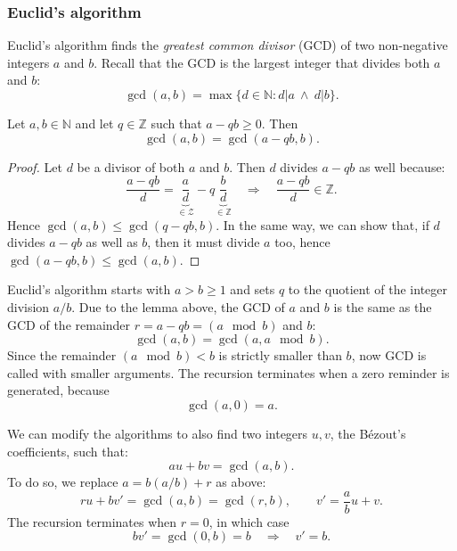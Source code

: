 \subsubsection{Euclid's algorithm}\label{s:impl-euclid}

Euclid's algorithm finds the \emph{greatest common divisor} (GCD) of two non-negative integers $a$ and $b$. Recall that the GCD is the largest integer that divides both $a$ and $b$:
\[
\gcd(a,b) = \max\{ d \in \mathbb{N} : d|a \ \wedge\ d|b \}.
\]

\begin{lemma}
	Let $a,b\in\mathbb{N}$ and let $q\in\mathbb{Z}$ such that $a - qb \geq 0$. Then
	$$
	\gcd(a,b) = \gcd(a-qb,b).
	$$
\end{lemma}
\begin{proof}
	Let $d$ be a divisor of both $a$ and $b$. Then $d$ divides $a - qb$ as well because:
	$$
	\frac{a - qb}{d} = 
	\underbrace{\frac{a}{d}}_{\in\mathcal{Z}} - q 
	\underbrace{\frac{b}{d}}_{\in\mathbb{Z}}
	\quad\Rightarrow\quad
	\frac{a - qb}{d} \in \mathbb{Z}.
	$$
	Hence  $\gcd(a,b) \leq \gcd(q-qb,b)$. In the same way, we can show that, if $d$ divides $a - qb$ as well as $b$, then it must divide $a$ too, hence $\gcd(a-qb, b) \leq\gcd(a,b)$.
\end{proof}

Euclid's algorithm starts with $a > b \geq 1$ and sets $q$ to the quotient of the integer division $a/b$. Due to the lemma above, the GCD of $a$ and $b$ is the same as the GCD of the remainder $r = a - qb = (a \mod b)$ and $b$:
\[
\gcd(a,b) = \gcd(a, a\mod b).
\]
Since the remainder $(a\mod b) < b$ is strictly smaller than $b$, now GCD is called with smaller arguments. The recursion terminates when a zero reminder is generated, because
\[
\gcd(a,0) = a.
\]

We can modify the algorithms to also find two integers  $u,v$, the B\'ezout's coefficients, such that:
$$
a u + bv = \gcd(a,b).
$$
To do so, we replace $a = b (a/b) + r$ as above:
$$
ru  +  b v'= \gcd(a,b) = \gcd(r,b), \qquad v' = \frac{a}{b} u + v.
$$
The recursion terminates when $r=0$, in which case
$$
b v'= \gcd(0,b) = b \quad\Rightarrow\quad v'=b.
$$





